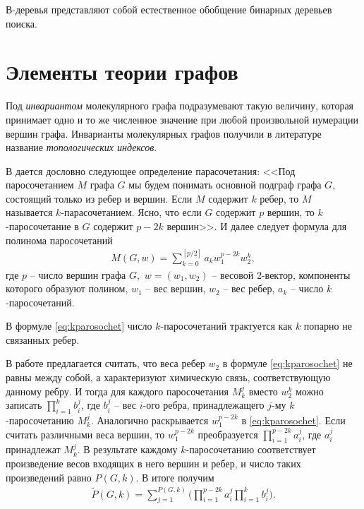 \documentclass[%
	11pt,
	a4paper,
	utf8,
		]{article}
\begin{document}
В-деревья представляют собой естественное обобщение бинарных деревьев поиска.


\section{Элементы теории графов}

Под \emph{инвариантом} молекулярного графа подразумевают такую величину, которая принимает одно и то же численное значение при любой произвольной нумерации вершин графа. Инварианты молекулярных графов получили в литературе название \emph{топологических индексов}.  

В \cite{farrel-combinatorial-theory:1979} дается дословно следующее определение парасочетания: <<Под паросочетанием $ M $ графа $ G $ мы будем понимать основной подграф графа $ G $, состоящий только из ребер и вершин. Если $ M $ содержит $ k $ ребер, то $ M $ называется $ k $-парасочетанием. Ясно, что если $ G $ содержит $ p $ вершин, то $ k $-паросочетание в $ G $ содержит $ p - 2k $ вершин>>. И далее следует формула для полинома паросочетаний
\begin{align}\label{eq:kparosochet}
	M(G, w) = \sum_{k = 0}^{ [ p/2 ]} a_k w_1^{p - 2k} w_2^k,
\end{align}
где $ p $ -- число вершин графа $ G, $ $ w = (w_1, w_2) $ -- весовой 2-вектор, компоненты которого образуют полином, $ w_1 $ -- вес вершин, $ w_2 $ -- вес ребер, $ a_k $ -- число $ k $-паросочетаний.

В формуле \eqref{eq:kparosochet} число $ k $-паросочетаний трактуется как $ k $ попарно не связанных ребер.

В работе \cite{kruglyak-new-invar:2015} предлагается считать, что веса ребер $ w_2 $ в формуле \eqref{eq:kparosochet} не равны между собой, а характеризуют химическую связь, соответствующую данному ребру. И тогда для каждого паросочетания $ M_k^j $ вместо $ w_2^k $ можно записать $ \prod_{i=1}^{k}b_i^j $, где $ b_i^j $ -- вес $ i $-ого ребра, принадлежащего $ j $-му $ k $-паросочетанию $ M_k^j $. Аналогично раскрывается $ w_1^{p-2k} $ в \ref{eq:kparosochet}. Если считать различными веса вершин, то $ w_1^{p-2k} $ преобразуется $ \prod_{i=1}^{p - 2k} a_i^j$, где $ a_i^j $ принадлежат $ M_k^j $. В результате каждому $ k $-паросочетанию соответствует произведение весов входящих в него вершин и ребер, и число таких произведений равно $ P(G, k) $. В итоге получим \cite{kruglyak-new-invar:2015}
\begin{align}\label{eq:p_tilde}
	\tilde{P}(G, k) = \sum_{j=1}^{P(G, k)} \Bigg( \prod_{i=1}^{p - 2k} a_i^j \prod_{i=1}^{k} b_i^j \Bigg).
\end{align}
\end{document}
